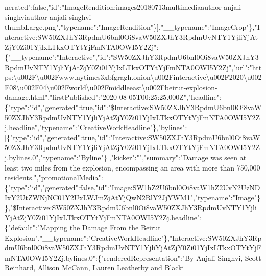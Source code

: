 nerated":false,"id":"ImageRendition:images20180713multimediaauthor-anjali-singhviauthor-anjali-singhvi-thumbLarge.png","typename":"ImageRendition"\}{]},"\_\_typename":"ImageCrop"\},"Interactive:SW50ZXJhY3RpdmU6bnl0Oi8vaW50ZXJhY3RpdmUvNTY1YjliYjAtZjY0Zi01YjIxLTkxOTYtYjFmNTA0OWI5Y2Zj":\{"\_\_typename":"Interactive","id":"SW50ZXJhY3RpdmU6bnl0Oi8vaW50ZXJhY3RpdmUvNTY1YjliYjAtZjY0Zi01YjIxLTkxOTYtYjFmNTA0OWI5Y2Zj","url":"https:\textbackslash{}u002F\textbackslash{}u002Fwww.nytimes3xbfgragh.onion\textbackslash{}u002Finteractive\textbackslash{}u002F2020\textbackslash{}u002F08\textbackslash{}u002F04\textbackslash{}u002Fworld\textbackslash{}u002Fmiddleeast\textbackslash{}u002Fbeirut-explosion-damage.html","firstPublished":"2020-08-05T00:25:25.000Z","headline":\{"type":"id","generated":true,"id":"\$Interactive:SW50ZXJhY3RpdmU6bnl0Oi8vaW50ZXJhY3RpdmUvNTY1YjliYjAtZjY0Zi01YjIxLTkxOTYtYjFmNTA0OWI5Y2Zj.headline","typename":"CreativeWorkHeadline"\},"bylines":{[}\{"type":"id","generated":true,"id":"Interactive:SW50ZXJhY3RpdmU6bnl0Oi8vaW50ZXJhY3RpdmUvNTY1YjliYjAtZjY0Zi01YjIxLTkxOTYtYjFmNTA0OWI5Y2Zj.bylines.0","typename":"Byline"\}{]},"kicker":"","summary":"Damage
was seen at least two miles from the explosion, encompassing an area
with more than 750,000
residents.","promotionalMedia":\{"type":"id","generated":false,"id":"Image:SW1hZ2U6bnl0Oi8vaW1hZ2UvN2UzNDIxY2UtZWNjNC01Y2UxLWJmZjAtYjQwN2RlY2JjYWM1","typename":"Image"\}\},"\$Interactive:SW50ZXJhY3RpdmU6bnl0Oi8vaW50ZXJhY3RpdmUvNTY1YjliYjAtZjY0Zi01YjIxLTkxOTYtYjFmNTA0OWI5Y2Zj.headline":\{"default":"Mapping
the Damage From the Beirut
Explosion","\_\_typename":"CreativeWorkHeadline"\},"Interactive:SW50ZXJhY3RpdmU6bnl0Oi8vaW50ZXJhY3RpdmUvNTY1YjliYjAtZjY0Zi01YjIxLTkxOTYtYjFmNTA0OWI5Y2Zj.bylines.0":\{"renderedRepresentation":"By
Anjali Singhvi, Scott Reinhard, Allison McCann, Lauren Leatherby and
Blacki
